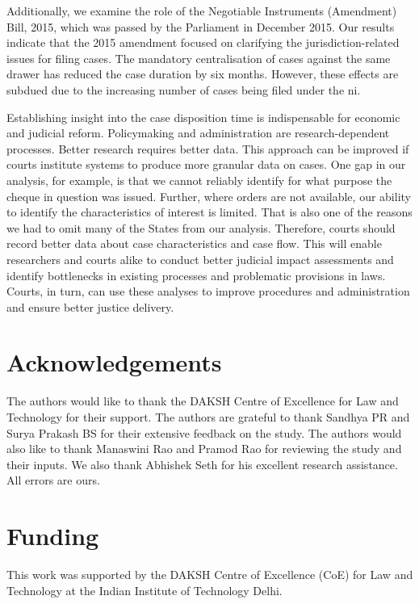 \documentclass[12pt,a4paper]{article}
\begin{document}
Additionally, we examine the role of the Negotiable Instruments (Amendment) Bill, 2015, which was passed by the Parliament in December 2015. Our results indicate that the 2015 amendment focused on clarifying the jurisdiction-related issues for filing cases. The mandatory centralisation of cases against the same drawer has reduced the case duration by six months. However, these effects are subdued due to the increasing number of cases being filed under the \gls{ni}.

Establishing insight into the case disposition time is indispensable for economic and judicial reform. Policymaking and administration are research-dependent processes. Better research requires better data. This approach can be improved if courts institute systems to produce more granular data on cases. One gap in our analysis, for example, is that we cannot reliably identify for what purpose the cheque in question was issued. Further, where orders are not available, our ability to identify the characteristics of interest is limited. That is also one of the reasons we had to omit many of the States from our analysis. Therefore, courts should record better data about case characteristics and case flow. This will enable researchers and courts alike to conduct better judicial impact assessments and identify bottlenecks in existing processes and problematic provisions in laws. Courts, in turn, can use these analyses to improve procedures and administration and ensure better justice delivery.

\section*{Acknowledgements}
The authors would like to thank the DAKSH Centre of Excellence for Law and Technology for their support. The authors are grateful to thank Sandhya PR and Surya Prakash BS for their extensive feedback on the study. The authors would also like to thank Manaswini Rao and Pramod Rao for reviewing the study and their inputs. We also thank Abhishek Seth for his excellent research assistance. All errors are ours.

\section*{Funding}
This work was supported by the DAKSH Centre of Excellence (CoE) for Law and Technology at the Indian Institute of Technology Delhi.

\newpage
\printbibliography[heading=bibintoc]
\end{document}
